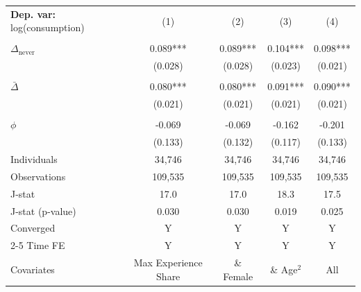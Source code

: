 \begin{tabular}{l cccc} \toprule  \textbf{Dep. var:}  log(consumption) 
                    &\multicolumn{1}{c}{(1)}   &\multicolumn{1}{c}{(2)}   &\multicolumn{1}{c}{(3)}   &\multicolumn{1}{c}{(4)}   \\
                    &               &               &               &               \\
\addlinespace
$\Delta_{\text{never}}$&       0.089***&       0.089***&       0.104***&       0.098***\\
                    &     (0.028)   &     (0.028)   &     (0.023)   &     (0.021)   \\
                    &               &               &               &               \\
\addlinespace
$\bar{\Delta}$      &       0.080***&       0.080***&       0.091***&       0.090***\\
                    &     (0.021)   &     (0.021)   &     (0.021)   &     (0.021)   \\
                    &               &               &               &               \\
\addlinespace
$\phi$              &      -0.069   &      -0.069   &      -0.162   &      -0.201   \\
                    &     (0.133)   &     (0.132)   &     (0.117)   &     (0.133)   \\
\addlinespace
Individuals         &      34,746   &      34,746   &      34,746   &      34,746   \\
Observations        &     109,535   &     109,535   &     109,535   &     109,535   \\
J-stat              &        17.0   &        17.0   &        18.3   &        17.5   \\
J-stat (p-value)    &       0.030   &       0.030   &       0.019   &       0.025   \\
Converged           &           Y   &           Y   &           Y   &           Y   \\
\cmidrule{2-5} Time FE & Y & Y & Y & Y \\ Covariates & Max Experience Share & \& Female & \& Age$^2$ & All \\ \bottomrule \end{tabular}
